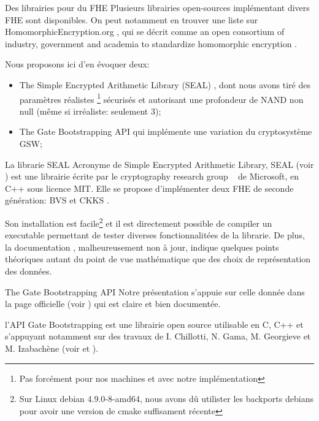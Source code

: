 \begin{section}{Des librairies pour du FHE}
Plusieurs librairies open-sources implémentant divers FHE sont disponibles. 
On peut notamment en trouver une liste sur HomomorphicEncryption.org \cite{homencrypt.org}, 
qui se décrit comme \og an open consortium of industry, government and academia to 
standardize homomorphic encryption \fg.

Nous proposons ici d'en évoquer deux:
\begin{itemize}
\item The Simple Encrypted Arithmetic Library (SEAL) \cite{seal}, dont nous avons tiré des paramètres  
\og réalistes \fg\footnote{Pas forcément pour nos machines et avec notre implémentation}
sécurisés et autorisant une profondeur de NAND non null (même si irréaliste: seulement 3);
\item The Gate Bootstrapping API \cite{TFHE} qui implémente une variation du cryptosystème GSW;
\end{itemize}

\begin{subsection}{La librarie SEAL}
Acronyme de Simple Encrypted Arithmetic Library, SEAL (voir \cite{seal}) 
est une librairie écrite par le \og cryptography research group \fg~ de Microsoft, en C++ sous 
licence MIT. Elle se propose d'implémenter deux FHE de seconde génération: 
BVS \cite{EPRINT:FanVer12} et CKKS \cite{AC:CKKS17}.

Son installation est facile\footnote{Sur Linux debian 4.9.0-8-amd64, nous avons dû
utilister les backports debians pour avoir une version de cmake suffisament récente}
et il est directement possible de compiler un executable permettant de tester 
diverses fonctionnalitées de la librarie. De plus, la documentation
\cite{seal_manual_231},
malheureusement non à jour, indique quelques points théoriques autant du point 
de vue mathématique que des choix de représentation des données.
\end{subsection}

\begin{subsection}{The Gate Bootstrapping API}
Notre présentation s'appuie sur celle donnée dans la page officielle (voir \cite{TFHE})
 qui est claire et bien documentée.

l'API Gate Bootstrapping est une librairie open source utilisable en C, C++ et 
s'appuyant notamment sur des travaux de I. Chillotti, N. Gama, M. Georgieve et M. Izabachène 
(voir \cite{cryptoeprint:2017:430} et  \cite{cryptoeprint:2016:870}). 


\end{subsection}
\end{section}
